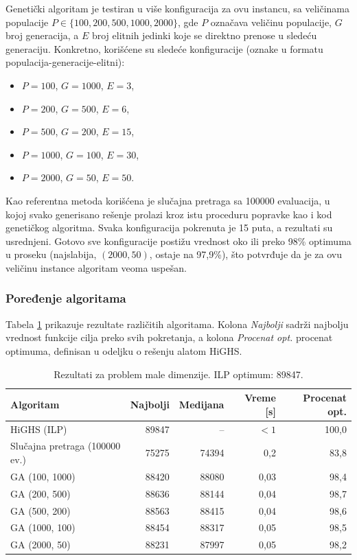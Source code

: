 \documentclass[12pt]{article}
\begin{document}
Genetički algoritam je testiran u više konfiguracija za ovu instancu, sa veličinama populacije $P \in \{100, 200, 500, 1000, 2000\}$, gde $P$ označava veličinu populacije, $G$ broj generacija, a $E$ broj elitnih jedinki koje se direktno prenose u sledeću generaciju. Konkretno, korišćene su sledeće konfiguracije (oznake u formatu populacija-generacije-elitni):
\begin{itemize}
    \item $P = 100$, $G = 1000$, $E = 3$,
    \item $P = 200$, $G = 500$, $E = 6$,
    \item $P = 500$, $G = 200$, $E = 15$,
    \item $P = 1000$, $G = 100$, $E = 30$,
    \item $P = 2000$, $G = 50$, $E = 50$.
\end{itemize}
Kao referentna metoda korišćena je slučajna pretraga sa 100000 evaluacija, u kojoj svako generisano rešenje prolazi kroz istu proceduru popravke kao i kod genetičkog algoritma. Svaka konfiguracija pokrenuta je 15 puta, a rezultati su usrednjeni. Gotovo sve konfiguracije postižu vrednost oko ili preko 98\% optimuma u proseku (najslabija, $(2000, 50)$, ostaje na 97,9\%), što potvrđuje da je za ovu veličinu instance algoritam veoma uspešan.

\subsubsection{Poređenje algoritama}

Tabela \ref{tab:r10} prikazuje rezultate različitih algoritama. Kolona \textit{Najbolji} sadrži najbolju vrednost funkcije cilja preko svih pokretanja, a kolona \textit{Procenat opt.} procenat optimuma, definisan u odeljku o rešenju alatom HiGHS.

\begin{table}[H]
\centering
\begin{tabular}{|l|r|r|r|r|}
\hline
Algoritam & Najbolji & Medijana & Vreme [s] & Procenat opt. \\ \hline
HiGHS (ILP) & 89847 & -- & $< 1$ & 100,0 \\ \hline
Slučajna pretraga (100000 ev.) & 75275 & 74394 & 0,2 & 83,8 \\ \hline
GA (100, 1000) & 88420 & 88080 & 0,03 & 98,4 \\ \hline
GA (200, 500) & 88636 & 88144 & 0,04 & 98,7 \\ \hline
GA (500, 200) & 88563 & 88415 & 0,04 & 98,6 \\ \hline
GA (1000, 100) & 88454 & 88317 & 0,05 & 98,5 \\ \hline
GA (2000, 50) & 88231 & 87997 & 0,05 & 98,2 \\ \hline
\end{tabular}
\caption{Rezultati za problem male dimenzije. ILP optimum: 89847.}
\label{tab:r10}
\end{table}
\end{document}
